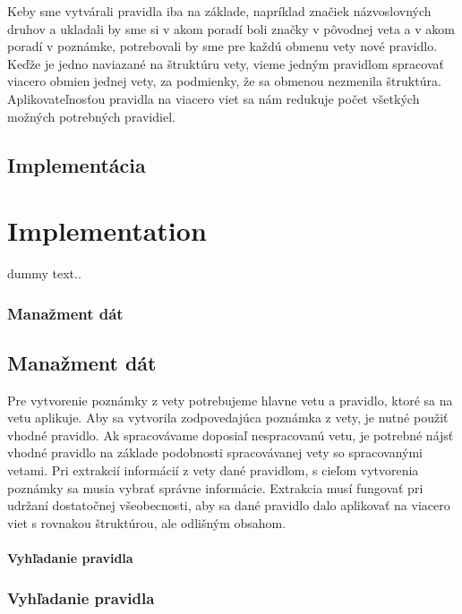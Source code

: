 Keby sme vytvárali pravidla iba na základe, napríklad značiek názvoslovných druhov a ukladali by sme si v akom poradí boli značky v pôvodnej veta a v akom poradí v poznámke, potrebovali by sme pre každú obmenu vety nové pravidlo. Keďže je jedno naviazané na štruktúru vety, vieme jedným pravidlom spracovať viacero obmien jednej vety, za podmienky, že sa obmenou nezmenila štruktúra. Aplikovateľnosťou pravidla na viacero viet sa nám redukuje počet všetkých možných potrebných pravidiel.

\newpage
%
%
{
	\section{Implementácia}
}
{
	\chapter{Implementation}
}
\label{section:implementation}
dummy text..

%
%
{
	\subsection{Manažment dát}
}
{
	\section{Manažment dát}
}
\label{subsection:data_management}
Pre vytvorenie poznámky z vety potrebujeme hlavne vetu a pravidlo, ktoré sa na vetu aplikuje. Aby sa vytvorila zodpovedajúca poznámka z vety, je nutné použiť vhodné pravidlo. Ak spracovávame doposiaľ nespracovanú vetu, je potrebné nájsť vhodné pravidlo na základe podobnosti spracovávanej vety so spracovanými vetami. Pri extrakcií informácií z vety dané pravidlom, s cieľom vytvorenia poznámky sa musia vybrať správne informácie. Extrakcia musí fungovať pri udržaní dostatočnej všeobecnosti, aby sa dané pravidlo dalo aplikovať na viacero viet s rovnakou štruktúrou, ale odlišným obsahom.

%
%
{
	\subsubsection{Vyhľadanie pravidla}
}
{
	\subsection{Vyhľadanie pravidla}
}

